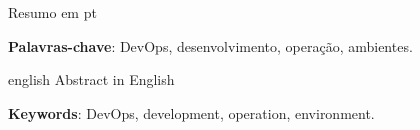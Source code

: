 \begin{resumo}
	Resumo em pt

	\vspace{\onelineskip}
	\noindent
	\textbf{Palavras-chave}: DevOps, desenvolvimento, operação, ambientes.
\end{resumo}

\begin{resumo}[Abstract]
	\begin{otherlanguage*}{english}
		Abstract in English

		\vspace{\onelineskip}
		\noindent
		\textbf{Keywords}: DevOps, development, operation, environment.
	\end{otherlanguage*}
\end{resumo}